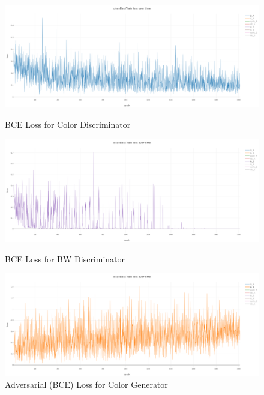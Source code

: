     \begin{figure}[htbp]
    \includegraphics[width=1\textwidth]{chapter/losses_png/d_a.png}
    \caption{BCE Loss for Color Discriminator}
    \includegraphics[width=1\textwidth]{chapter/losses_png/d_b.png}
    \caption{BCE Loss for BW Discriminator}
    
    \includegraphics[width=1\textwidth]{chapter/losses_png/g_a.png}
    \caption{Adversarial (BCE) Loss for Color Generator}
     \end{figure}
    \pagebreak
    \newpage
